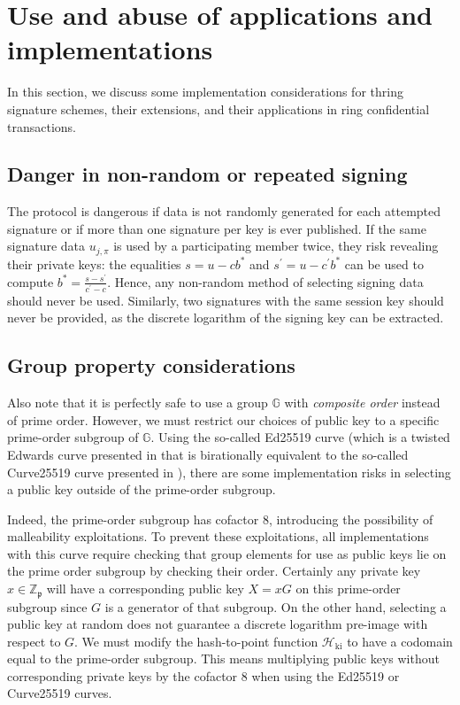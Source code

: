 \documentclass{iacrtrans}
\theoremstyle{definition}
\numberwithin{theorem}{subsection}
\numberwithin{lemma}{theorem}
\newcommand{\p}{\mathfrak{p}}
\begin{document}
\section{Use and abuse of applications and implementations}

In this section, we discuss some implementation considerations for thring signature schemes, their extensions, and their applications in ring confidential transactions. %



\subsection{Danger in non-random or repeated signing}


The protocol is dangerous if data is not randomly generated for each attempted signature or if more than one signature per key is ever published. If the same signature data $u_{j,\pi}$ is used by a participating member twice, they risk revealing their private keys: the equalities $s = u - c b^*$ and $s^\prime = u - c^\prime b^*$ can be used to compute $b^* = \frac{s-s^\prime}{c^\prime - c}$. Hence, any non-random method of selecting signing data should never be used. Similarly, two signatures with the same session key should never be provided, as the discrete logarithm of the signing key can be extracted.

\subsection{Group property considerations}

Also note that it is perfectly safe to use a group $\mathbb{G}$ with \textit{composite order} instead of prime order. However, we must restrict our choices of public key to a specific prime-order subgroup of $\mathbb{G}$. Using the so-called Ed25519 curve (which is a twisted Edwards curve presented in \cite{bernstein2012high} that is birationally equivalent to the so-called Curve25519 curve presented in \cite{bernstein2006curve25519}), there are some implementation risks in selecting a public key outside of the prime-order subgroup. 

Indeed, the prime-order subgroup has cofactor $8$, introducing the possibility of malleability exploitations. To prevent these exploitations, all implementations with this curve require checking that group elements for use as public keys lie on the prime order subgroup by checking their order. Certainly any private key $x \in \mathbb{Z}_\p$ will have a corresponding public key $X = xG$ on this prime-order subgroup since $G$ is a generator of that subgroup. On the other hand, selecting a public key at random does not guarantee a discrete logarithm pre-image with respect to $G$. We must modify the hash-to-point function $\mathcal{H}_{\text{ki}}$ to have a codomain equal to the prime-order subgroup. This means multiplying public keys without corresponding private keys by the cofactor $8$ when using the Ed25519 or Curve25519 curves.
\end{document}

